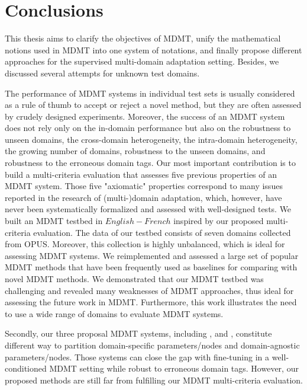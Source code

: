 \chapter{Conclusions}
\label{chap:conclusion}
This thesis aims to clarify the objectives of MDMT, unify the mathematical notions used in MDMT into one system of notations, and finally propose different approaches for the supervised multi-domain adaptation setting. Besides, we discussed several attempts for unknown test domains.

The performance of MDMT systems in individual test sets is usually considered as a rule of thumb to accept or reject a novel method, but they are often assessed by crudely designed experiments. Moreover, the success of an MDMT system does not rely only on the in-domain performance but also on the robustness to unseen domains, the cross-domain heterogeneity, the intra-domain heterogeneity, the growing number of domains, robustness to the unseen domains, and robustness to the erroneous domain tags. Our most important contribution is to build a multi-criteria evaluation that assesses five previous properties of an MDMT system. Those five "axiomatic" properties correspond to many issues reported in the research of (multi-)domain adaptation, which, however, have never been systematically formalized and assessed with well-designed tests. We built an MDMT testbed in $English-French$ inspired by our proposed multi-criteria evaluation. The data of our testbed consists of seven domains collected from OPUS. Moreover, this collection is highly unbalanced, which is ideal for assessing MDMT systems. We reimplemented and assessed a large set of popular MDMT methods that have been frequently used as baselines for comparing with novel MDMT methods. We demonstrated that our MDMT testbed was challenging and revealed many weaknesses of MDMT approaches, thus ideal for assessing the future work in MDMT. Furthermore, this work illustrates the need to use a wide range of domains to evaluate MDMT systems.

Secondly, our three proposal MDMT systems, including ,  and , constitute different way to partition domain-specific parameters/nodes and domain-agnostic parameters/nodes. Those systems can close the gap with fine-tuning in a well-conditioned MDMT setting while robust to erroneous domain tags. However, our proposed methods are still far from fulfilling our MDMT multi-criteria evaluation.

